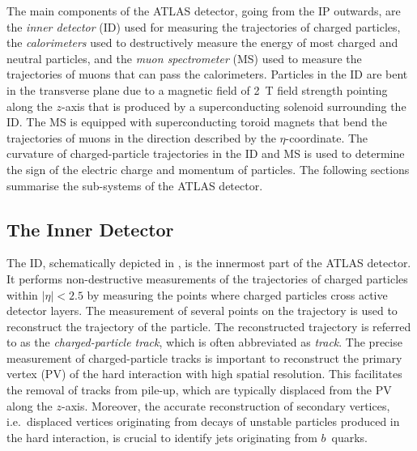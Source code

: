 The main components of the ATLAS detector, going from the IP outwards, are the
\emph{inner detector} (ID) used for measuring the trajectories of charged
particles, the \emph{calorimeters} used to destructively measure the energy of
most charged and neutral particles, and the \emph{muon spectrometer} (MS) used
to measure the trajectories of muons that can pass the calorimeters. Particles
in the ID are bent in the transverse plane due to a magnetic field of
\SI{2}{\tesla} field strength pointing along the $z$-axis that is produced by a
superconducting solenoid surrounding the ID.  The MS is equipped with
superconducting toroid magnets that bend the trajectories of muons in the
direction described by the $\eta$-coordinate. The curvature of charged-particle
trajectories in the ID and MS is used to determine the sign of the electric
charge and momentum of particles. The following sections summarise the
sub-systems of the ATLAS detector.


\subsection{The Inner Detector}

The ID, schematically depicted in , is the
innermost part of the ATLAS detector. It performs non-destructive measurements
of the trajectories of charged particles within $|\eta| < 2.5$ by measuring the
points where charged particles cross active detector layers. The measurement of
several points on the trajectory
is used to reconstruct the trajectory of the particle. The reconstructed
trajectory is referred to as the \emph{charged-particle track}, which is often
abbreviated as \emph{track}. The precise measurement of charged-particle tracks
is important to reconstruct the primary vertex (PV) of the hard interaction with
high spatial resolution. This facilitates the removal of tracks from pile-up,
which are typically displaced from the PV along the $z$-axis. Moreover, the
accurate reconstruction of secondary vertices, i.e.\ displaced vertices
originating from decays of unstable particles produced in the hard interaction,
is crucial to identify jets originating from
$b$~quarks. %

